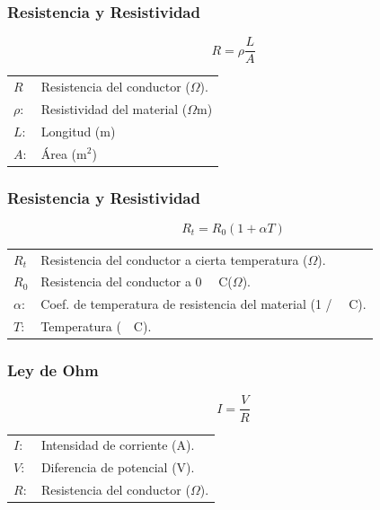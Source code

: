 \documentclass[handout]{beamer}
\newcommand{\celsius}{~\textdegree~C}
\begin{document}
\begin{frame}
  \frametitle{Resistencia y Resistividad}
  
  {\huge \[R = \rho \frac{L}{A}\]}
  
  \begin{tabular}{ll}
    $R$ & Resistencia del conductor ($\Omega$).  \\ 
    $\rho:$ & Resistividad del material ($\Omega$m) \\ 
    $L:$ & Longitud (m) \\
    $A:$ & Área (m$^2$) \\
  \end{tabular}
  
\end{frame}

\begin{frame}
  \frametitle{Resistencia y Resistividad}
  
  {\huge \[R_t = R_0 (1+\alpha T)\]}
  
  \begin{tabular}{ll}
    $R_t$ & Resistencia del conductor a cierta temperatura ($\Omega$).  \\ 
    $R_0$ & Resistencia del conductor a 0 \celsius ($\Omega$).  \\ 
    $\alpha:$ & Coef. de temperatura de resistencia del material (1 / \celsius). \\ 
    $T:$ & Temperatura (\celsius). \\
  \end{tabular}
  
\end{frame}


\begin{frame}
  \frametitle{Ley de Ohm}
  
  {\huge \[I  = \frac{V}{R}\]}
  
  \begin{tabular}{ll}
    $I:$ & Intensidad de corriente (A).  \\ 
    $V:$ & Diferencia de potencial (V).  \\ 
    $R:$ & Resistencia del conductor ($\Omega$). \\ 
  \end{tabular}
  
\end{frame}
\end{document}
